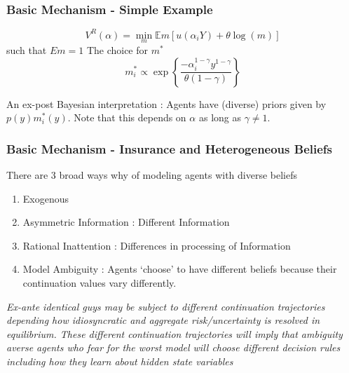 \documentclass{beamer}
\theoremstyle{Definition}
\begin{document}
\begin{frame}
\frametitle{Basic Mechanism - Simple Example}
\[V^R (\alpha)=\min_{m}\mathbb{E}m[u(\alpha_iY)+\theta\log(m)]\]
such that 
$Em=1$
 The choice for $m^*$
\[m_i^*\propto \exp\left\{\frac {-\alpha^{1-\gamma}_iy^{1-\gamma}}{\theta(1-\gamma)}\right\}\]

An ex-post Bayesian interpretation : Agents have (diverse) priors given by $p(y)m^*_i(y)$. Note that this depends on $\alpha$ as long as $\gamma \neq 1$.

\end{frame}

\begin{frame}

\frametitle{Basic Mechanism - Insurance and Heterogeneous Beliefs}
There are 3 broad ways why of modeling agents with diverse beliefs
\begin{enumerate}
	\item Exogenous 
	\item Asymmetric Information : Different Information  
	\item Rational Inattention  : Differences in processing of Information
	\item Model Ambiguity : Agents `choose' to have different beliefs because their continuation values vary differently. 
\end{enumerate}

\small{
\emph{ Ex-ante identical guys may be subject to different continuation trajectories depending how idiosyncratic and aggregate risk/uncertainty is resolved in equilibrium. These different continuation trajectories will imply that ambiguity averse agents who fear for the worst model will choose different decision rules including how they learn about hidden state variables}}
\end{frame}

\end{document}

